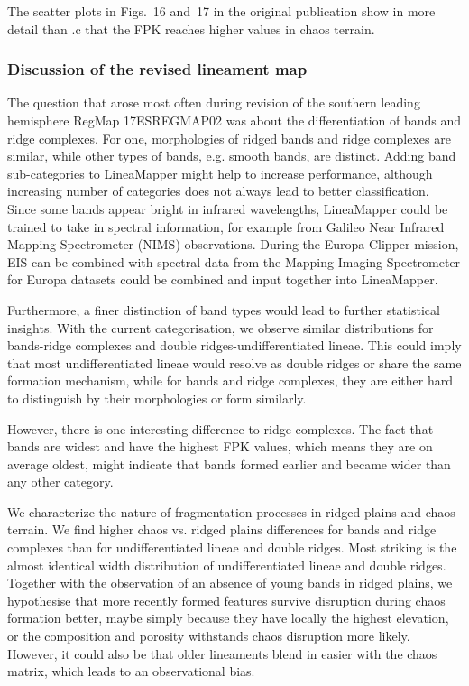 The scatter plots in Figs.~16 and~17 in the original publication show in more detail than .c that the FPK reaches higher values in chaos terrain.

\subsubsection{Discussion of the revised lineament map}\label{sec:discussing_revisedMap}
The question that arose most often during revision of the southern leading hemisphere RegMap 17ESREGMAP02 was about the differentiation of bands and ridge complexes. For one, morphologies of ridged bands and ridge complexes are similar, while other types of bands, e.g. smooth bands, are distinct. Adding band sub-categories to LineaMapper might help to increase performance, although increasing number of categories does not always lead to better classification. Since some bands appear bright in infrared wavelengths, LineaMapper could be trained to take in spectral information, for example from Galileo Near Infrared Mapping Spectrometer (NIMS) observations. During the Europa Clipper mission, EIS can be combined with spectral data from the Mapping Imaging Spectrometer for Europa datasets could be combined and input together into LineaMapper.

Furthermore, a finer distinction of band types would lead to further statistical insights. With the current categorisation, we observe similar distributions for bands-ridge complexes and double ridges-undifferentiated lineae. This could imply that most undifferentiated lineae would resolve as double ridges or share the same formation mechanism, while for bands and ridge complexes, they are either hard to distinguish by their morphologies or form similarly. 

However, there is one interesting difference to ridge complexes. The fact that bands are widest and have the highest FPK values, which means they are on average oldest, might indicate that bands formed earlier and became wider than any other category. %

We characterize the nature of fragmentation processes in ridged plains and chaos terrain.
We find higher chaos vs. ridged plains differences for bands and ridge complexes than for undifferentiated lineae and double ridges. Most striking is the almost identical width distribution of undifferentiated lineae and double ridges.
Together with the observation of an absence of young bands in ridged plains, we hypothesise that more recently formed features survive disruption during chaos formation better, maybe simply because they have locally the highest elevation, or the composition and porosity withstands chaos disruption more likely. However, it could also be that older lineaments blend in easier with the chaos matrix, which leads to an observational bias.  

